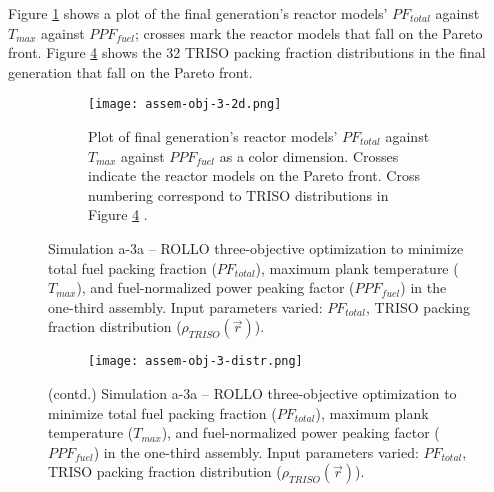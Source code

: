 Figure \ref{fig:assem-obj-3-3d} shows a plot of the final generation's reactor models' 
$PF_{total}$ against $T_{max}$ against $PPF_{fuel}$; crosses mark the reactor models 
that fall on the Pareto front.
Figure \ref{fig:assem-obj-3-distr} shows the 32 TRISO packing fraction distributions in 
the final generation that fall on the Pareto front. 
\begin{figure}[htbp!]
    \begin{subfigure}{\textwidth}
        \centering
        \texttt{[image: assem-obj-3-2d.png]}
        \caption{Plot of final generation's reactor models' $PF_{total}$ against 
        $T_{max}$ against $PPF_{fuel}$ as a color dimension. 
        Crosses indicate the reactor models on the 
        Pareto front. Cross numbering correspond to TRISO distributions in Figure 
        \ref{fig:assem-obj-3-distr} .}
        \label{fig:assem-obj-3-3d} 
    \end{subfigure}
    \caption{Simulation a-3a -- ROLLO three-objective optimization to minimize total 
    fuel packing fraction ($PF_{total}$), maximum plank temperature ($T_{max}$), and 
    fuel-normalized power peaking factor ($PPF_{fuel}$) in the one-third assembly. 
    Input parameters varied: $PF_{total}$, TRISO packing fraction distribution
    ($\rho_{TRISO}(\vec{r})$).}
    \label{fig:assem-obj-3}
\end{figure}
\begin{figure}[htbp!]
    \ContinuedFloat
    \begin{subfigure}{\textwidth}
        \centering
        \texttt{[image: assem-obj-3-distr.png]}
        \caption{}
        \label{fig:assem-obj-3-distr} 
    \end{subfigure}
    \caption{(contd.) Simulation a-3a -- ROLLO three-objective optimization to minimize 
    total fuel packing fraction ($PF_{total}$), maximum plank temperature ($T_{max}$),
    and fuel-normalized power peaking factor ($PPF_{fuel}$) in the one-third assembly. 
    Input parameters varied: $PF_{total}$, TRISO packing fraction distribution
    ($\rho_{TRISO}(\vec{r})$).}
\end{figure}

